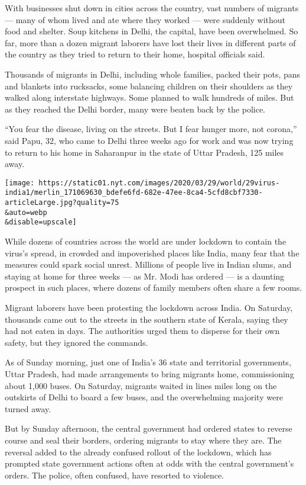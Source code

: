 With businesses shut down in cities across the country, vast numbers of
migrants --- many of whom lived and ate where they worked --- were
suddenly without food and shelter. Soup kitchens in Delhi, the capital,
have been overwhelmed. So far, more than a dozen migrant laborers have
lost their lives in different parts of the country as they tried to
return to their home, hospital officials said.

Thousands of migrants in Delhi, including whole families, packed their
pots, pans and blankets into rucksacks, some balancing children on their
shoulders as they walked along interstate highways. Some planned to walk
hundreds of miles. But as they reached the Delhi border, many were
beaten back by the police.

``You fear the disease, living on the streets. But I fear hunger more,
not corona,'' said Papu, 32, who came to Delhi three weeks ago for work
and was now trying to return to his home in Saharanpur in the state of
Uttar Pradesh, 125 miles away.

\texttt{[image: https://static01.nyt.com/images/2020/03/29/world/29virus-india1/merlin\_171069630\_bdefe6fd-682e-47ee-8ca4-5cfd8cbf7330-articleLarge.jpg?quality=75\\\&auto=webp\\\&disable=upscale]}

While dozens of countries across the world are under lockdown to contain
the virus's spread, in crowded and impoverished places like India, many
fear that the measures could spark social unrest. Millions of people
live in Indian slums, and staying at home for three weeks --- as Mr.
Modi has ordered --- is a daunting prospect in such places, where dozens
of family members often share a few rooms.

Migrant laborers have been protesting the lockdown across India. On
Saturday, thousands came out to the streets in the southern state of
Kerala, saying they had not eaten in days. The authorities urged them to
disperse for their own safety, but they ignored the commands.

As of Sunday morning, just one of India's 36 state and territorial
governments, Uttar Pradesh, had made arrangements to bring migrants
home, commissioning about 1,000 buses. On Saturday, migrants waited in
lines miles long on the outskirts of Delhi to board a few buses, and the
overwhelming majority were turned away.

But by Sunday afternoon, the central government had ordered states to
reverse course and seal their borders, ordering migrants to stay where
they are. The reversal added to the already confused rollout of the
lockdown, which has prompted state government actions often at odds with
the central government's orders. The police, often confused, have
resorted to violence.


